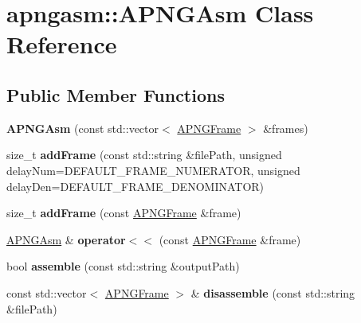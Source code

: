 \hypertarget{classapngasm_1_1APNGAsm}{\section{apngasm\-:\-:A\-P\-N\-G\-Asm Class Reference}
\label{classapngasm_1_1APNGAsm}
}
\subsection*{Public Member Functions}
\begin{DoxyCompactItemize}
\item 
\hypertarget{classapngasm_1_1APNGAsm_a4f8cc13561379ed9fdf7cbe132e1e496}{{\bfseries A\-P\-N\-G\-Asm} (const std\-::vector$<$ \hyperlink{classapngasm_1_1APNGFrame}{A\-P\-N\-G\-Frame} $>$ \&frames)}\label{classapngasm_1_1APNGAsm_a4f8cc13561379ed9fdf7cbe132e1e496}

\item 
\hypertarget{classapngasm_1_1APNGAsm_a937cbf8260ee5ce8ae1a589fb07e357f}{size\-\_\-t {\bfseries add\-Frame} (const std\-::string \&file\-Path, unsigned delay\-Num=D\-E\-F\-A\-U\-L\-T\-\_\-\-F\-R\-A\-M\-E\-\_\-\-N\-U\-M\-E\-R\-A\-T\-O\-R, unsigned delay\-Den=D\-E\-F\-A\-U\-L\-T\-\_\-\-F\-R\-A\-M\-E\-\_\-\-D\-E\-N\-O\-M\-I\-N\-A\-T\-O\-R)}\label{classapngasm_1_1APNGAsm_a937cbf8260ee5ce8ae1a589fb07e357f}

\item 
\hypertarget{classapngasm_1_1APNGAsm_ab90be230c206a50f9b2cb9ff64f932bc}{size\-\_\-t {\bfseries add\-Frame} (const \hyperlink{classapngasm_1_1APNGFrame}{A\-P\-N\-G\-Frame} \&frame)}\label{classapngasm_1_1APNGAsm_ab90be230c206a50f9b2cb9ff64f932bc}

\item 
\hypertarget{classapngasm_1_1APNGAsm_ad3c3260ad6a8b004ccb955c9425d5053}{\hyperlink{classapngasm_1_1APNGAsm}{A\-P\-N\-G\-Asm} \& {\bfseries operator$<$$<$} (const \hyperlink{classapngasm_1_1APNGFrame}{A\-P\-N\-G\-Frame} \&frame)}\label{classapngasm_1_1APNGAsm_ad3c3260ad6a8b004ccb955c9425d5053}

\item 
\hypertarget{classapngasm_1_1APNGAsm_ae2d72070a6f76248e717c027c2c19bbd}{bool {\bfseries assemble} (const std\-::string \&output\-Path)}\label{classapngasm_1_1APNGAsm_ae2d72070a6f76248e717c027c2c19bbd}

\item 
\hypertarget{classapngasm_1_1APNGAsm_ab905012a98e04946623252b5561453aa}{const std\-::vector$<$ \hyperlink{classapngasm_1_1APNGFrame}{A\-P\-N\-G\-Frame} $>$ \& {\bfseries disassemble} (const std\-::string \&file\-Path)}\label{classapngasm_1_1APNGAsm_ab905012a98e04946623252b5561453aa}


\end{DoxyCompactItemize}
